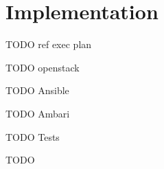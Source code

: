 \chapter{Implementation}
\label{chap:impl}

TODO ref exec plan

TODO openstack

TODO Ansible

TODO Ambari

TODO Tests


TODO
